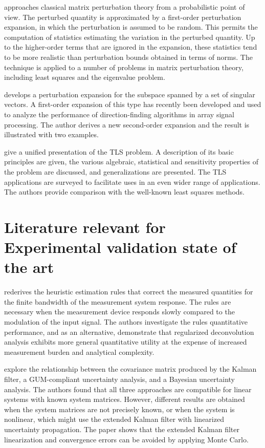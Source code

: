 \documentclass[11pt]{article}
\begin{document}
\citet{Stewart90SPT} approaches  classical matrix perturbation theory from a probabilistic point of view. The perturbed quantity is approximated by a first-order perturbation expansion, in which the perturbation is assumed to be random. This permits the computation of statistics estimating the variation in the perturbed quantity. Up to the higher-order terms that are ignored in the expansion, these statistics tend to be more realistic than perturbation bounds obtained in terms of norms. The technique is applied to a number of problems in matrix perturbation theory, including least squares and the eigenvalue problem.

\citet{Vaccaro94} develops a perturbation expansion for the subspace spanned by a set of singular vectors. A first-order expansion of this type has recently been developed and used to analyze the performance of direction-finding algorithms in array signal processing. The author derives a new second-order expansion and the result is illustrated with two examples.

\citet{VanHuffel91Book}  give a unified presentation of the TLS problem. A description of its basic principles are given, the various algebraic, statistical and sensitivity properties of the problem are discussed, and generalizations are presented. The TLS applications are surveyed to facilitate uses in an even wider range of applications. The authors provide comparison  with the well-known least squares methods.






\section{Literature relevant for Experimental validation state of the art}

\citet{Dienstfrey14} rederives the heuristic estimation rules that correct the measured quantities for the finite bandwidth of the measurement system response.
The rules are necessary when the measurement device responds slowly compared to the modulation of the input signal. The authors investigate the rules quantitative performance, and as an alternative, demonstrate that regularized deconvolution analysis exhibits more general quantitative utility at the expense of increased measurement burden and analytical complexity.

\citet{Eichstadt16b} explore the relationship between the covariance matrix produced by the Kalman filter, a GUM-compliant uncertainty analysis, and a Bayesian uncertainty analysis. The authors found that all three approaches are compatible for linear systems with known system matrices. However, different results are obtained when the system matrices are not precisely known, or when the system is nonlinear, which might use the extended Kalman filter with linearized uncertainty propagation. The paper shows that the extended Kalman filter linearization and convergence errors can be avoided by applying Monte Carlo.
\end{document}
